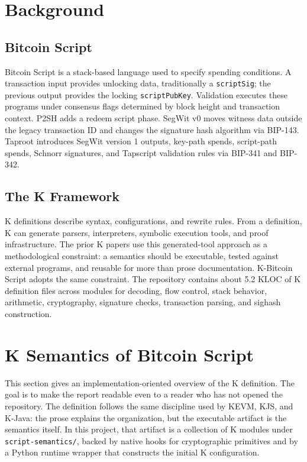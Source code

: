 \documentclass[conference]{IEEEtran}
\newcommand{\bitcoin}{Bitcoin\xspace}
\begin{document}
\section{Background}

\subsection{Bitcoin Script}

\bitcoin Script is a stack-based language used to specify spending conditions.
A transaction input provides unlocking data, traditionally a
\texttt{scriptSig}; the previous output provides the locking
\texttt{scriptPubKey}.  Validation executes these programs under consensus
flags determined by block height and transaction context.  P2SH adds a redeem
script phase.  SegWit v0 moves witness data outside the legacy transaction ID
and changes the signature hash algorithm via BIP-143.  Taproot introduces
SegWit version 1 outputs, key-path spends, script-path spends, Schnorr
signatures, and Tapscript validation rules via BIP-341 and BIP-342.

\subsection{The K Framework}

K definitions describe syntax, configurations, and rewrite rules.  From a
definition, K can generate parsers, interpreters, symbolic execution tools, and
proof infrastructure.  The prior K papers use this generated-tool approach as a
methodological constraint: a semantics should be executable, tested against
external programs, and reusable for more than prose documentation.  K-Bitcoin
Script adopts the same constraint.  The repository contains about 5.2 KLOC of
K definition files across modules for decoding, flow control, stack behavior,
arithmetic, cryptography, signature checks, transaction parsing, and sighash
construction.

\section{K Semantics of Bitcoin Script}

This section gives an implementation-oriented overview of the K definition.
The goal is to make the report readable even to a reader who has not opened
the repository.  The definition follows the same discipline used by KEVM, KJS,
and K-Java: the prose explains the organization, but the executable artifact
is the semantics itself.  In this project, that artifact is a collection of K
modules under \texttt{script-semantics/}, backed by native hooks for
cryptographic primitives and by a Python runtime wrapper that constructs the
initial K configuration.
\end{document}
